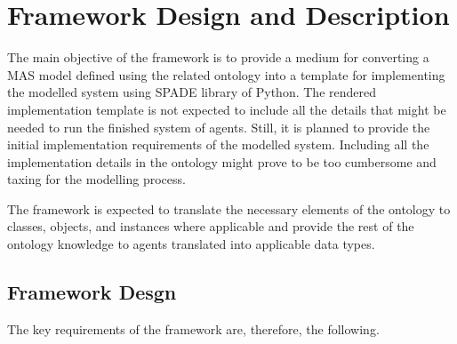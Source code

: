 \chapter{Framework Design and Description}\label{ch: Framework Design}


The main objective of the \magoontologyname framework is to provide a medium for converting a \ac{MAS} model defined using the related \magoontologyname ontology into a template for implementing the modelled system using \ac{SPADE} library of Python. The rendered implementation template is not expected to include all the details that might be needed to run the finished system of agents. Still, it is planned to provide the initial implementation requirements of the modelled system. Including all the implementation details in the ontology might prove to be too cumbersome and taxing for the modelling process.

The framework is expected to translate the necessary elements of the ontology to classes, objects, and instances where applicable and provide the rest of the ontology knowledge to agents translated into applicable data types.

\section{Framework Desgn}

The key requirements of the framework are, therefore, the following.

